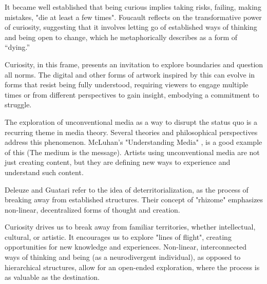 It became well established that being curious implies taking risks, failing, making mistakes, "die at least a few times". \citep{foucault1980masked} Foucault reflects on the transformative power of curiosity, suggesting that it involves letting go of established ways of thinking and being open to change, which he metaphorically describes as a form of “dying.”

Curiosity, in this frame, presents an invitation to explore boundaries and question all norms. The digital and other forms of artwork inspired by this can evolve in forms that resist being fully understood, requiring viewers to engage multiple times or from different perspectives to gain insight, embodying a commitment to struggle.

The exploration of unconventional media as a way to disrupt the status quo is a recurring theme in media theory. Several theories and philosophical perspectives address this phenomenon. McLuhan's "Understanding Media" \citep{mcluhan1964}, is a good example of this (The medium is the message). Artists using unconventional media are not just creating content, but they are defining new ways to experience and understand such content.

Deleuze and Guatari refer to the idea of deterritorialization, as the process of breaking away from established structures. Their concept of "rhizome" emphasizes non-linear, decentralized forms of thought and creation. \citep{deleuze1980} 

Curiosity drives us to break away from familiar territories, whether intellectual, cultural, or artistic. It encourages us to explore "lines of flight", creating opportunities for new knowledge and experiences. Non-linear, interconnected ways of thinking and being (as a neurodivergent individual), as opposed to hierarchical structures,  allow for an open-ended exploration, where the process is as valuable as the destination.
